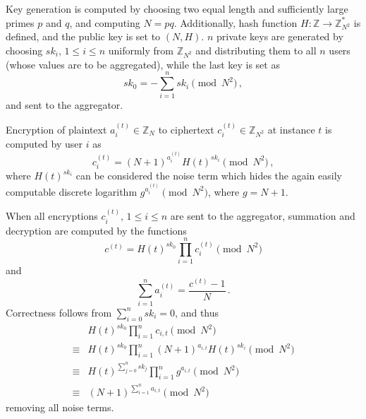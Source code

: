 \documentclass[10pt,letterpaper,oneside,twocolumn,journal]{IEEEtran}
\theoremstyle{definition}
\theoremstyle{definition}
\theoremstyle{remark}
\begin{document}
Key generation is computed by choosing two equal length and sufficiently large primes $p$ and $q$, and computing $N=pq$. Additionally, hash function $H:\mathbb{Z} \rightarrow \mathbb{Z}_{N^2}^*$ is defined, and the public key is set to $(N, H)$. $n$ private keys are generated by choosing $sk_i,\,1\leq i\leq n$ uniformly from $\mathbb{Z}_{N^2}$ and distributing them to all $n$ users (whose values are to be aggregated), while the last key is set as
\begin{equation}
    sk_0 = -\sum^{n}_{i=1}sk_i \pmod{N^2}\,,
\end{equation}
and sent to the aggregator.

Encryption of plaintext $a^{(t)}_{i} \in \mathbb{Z}_N$ to ciphertext $c^{(t)}_{i} \in \mathbb{Z}_{N^2}$ at instance $t$ is computed by user $i$ as
\begin{equation}
    c^{(t)}_{i} = (N+1)^{a^{(t)}_{i}} H(t)^{sk_i} \pmod{N^2}\,,
\end{equation}
where $H(t)^{sk_i}$ can be considered the noise term which hides the again easily computable discrete logarithm $g^{a^{(t)}_{i}} \pmod{N^2}$, where $g=N+1$.

When all encryptions $c^{(t)}_{i},\,1\leq i \leq n$ are sent to the aggregator, summation and decryption are computed by the functions
\begin{equation}
    c^{(t)} = H(t)^{sk_0}\prod^{n}_{i=1}c^{(t)}_{i} \pmod{N^2}
\end{equation}
and
\begin{equation}
    \sum^{n}_{i=1}a^{(t)}_{i} = \frac{c^{(t)}-1}{N}\,. \label{eqn:agg_decryption}
\end{equation}
Correctness follows from $\sum^{n}_{i=0}sk_i = 0$, and thus
\begin{equation*}
    \begin{split}
        &H(t)^{sk_0}\prod^{n}_{i=1}c_{i,t} \pmod{N^2} \\
        \equiv &H(t)^{sk_0}\prod^{n}_{i=1}(N+1)^{a_{i,t}} H(t)^{sk_i} \pmod{N^2} \\
        \equiv &H(t)^{\sum^n_{j=0}sk_j} \prod^{n}_{i=1}g^{a_{i,t}} \pmod{N^2} \\
        \equiv &(N+1)^{\sum^n_{i=1}a_{i,t}} \pmod{N^2}
    \end{split}
\end{equation*}
removing all noise terms.

% 
% 
\end{document}
